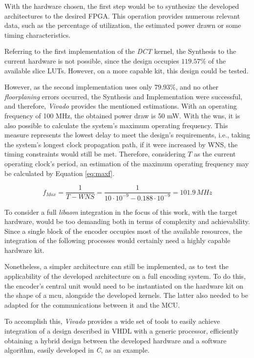 With the hardware chosen, the first step would be to synthesize the developed architectures to the desired FPGA. This operation provides numerous relevant data, such as the percentage of utilization, the estimated power drawn or some timing characteristics. 

Referring to the first implementation of the \emph{DCT} kernel, the Synthesis to the current hardware is not possible, since the design occupies $119.57\%$ of the available slice LUTs. However, on a more capable kit, this design could be tested.

However, as the second implementation uses only $79.93\%$, and no other \emph{floorplaning} errors occurred, the Synthesis and Implementation were successful, and therefore, \emph{Vivado} provides the mentioned estimations. With an operating frequency of 100 MHz, the obtained power draw is 50 mW. With the \gls{wns}, it is also possible to calculate the system's maximum operating frequency. This measure represents the lowest delay to meet the design's requirements, i.e., taking the system's longest clock propagation path, if it were increased by WNS, the timing constraints would still be met. Therefore, considering $T$ as the current operating clock's period, an estimation of the maximum operating frequency may be calculated by Equation \ref{eq:maxf}.

\begin{equation} \label{eq:maxf}
    f_{Max} = \frac{1}{T-WNS} = \frac{1}{10\cdot 10^{-9} - 0.188\cdot 10^{-9}} = 101.9\,MHz
\end{equation}

To consider a full \emph{libaom} integration in the focus of this work, with the target hardware, would be too demanding both in terms of complexity and achievability. Since a single block of the encoder occupies most of the available resources, the integration of the following processes would certainly need a highly capable hardware kit. 

Nonetheless, a simpler architecture can still be implemented, as to test the applicability of the developed architecture on a full encoding system. To do this, the encoder's central unit would need to be instantiated on the hardware kit on the shape of a \gls{mcu}, alongside the developed kernels. The latter also needed to be adapted for the communications between it and the MCU.

To accomplish this, \emph{Vivado} provides a wide set of tools to easily achieve integration of a design described in VHDL with a generic processor, efficiently obtaining a hybrid design between the developed hardware and a software algorithm, easily developed in \emph{C}, as an example.

